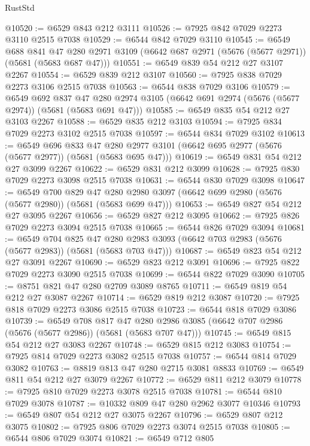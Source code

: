 \begin{lexlean}{RustStd}
\begin{coremodule}
@10520 := @6529 @843 @212 @3111
@10526 := @7925 @842 @7029 @2273 @3110 @2515 @7038
@10529 := @6544 @842 @7029 @3110
@10545 := @6549
    @688
    @841
    @47
    @280
    @2971
    @3109
    (@6642 @687 @2971 (@5676 (@5677 @2971)) (@5681 (@5683 @687 @47)))
@10551 := @6549 @839 @54 @212 @27 @3107 @2267
@10554 := @6529 @839 @212 @3107
@10560 := @7925 @838 @7029 @2273 @3106 @2515 @7038
@10563 := @6544 @838 @7029 @3106
@10579 := @6549
    @692
    @837
    @47
    @280
    @2974
    @3105
    (@6642 @691 @2974 (@5676 (@5677 @2974)) (@5681 (@5683 @691 @47)))
@10585 := @6549 @835 @54 @212 @27 @3103 @2267
@10588 := @6529 @835 @212 @3103
@10594 := @7925 @834 @7029 @2273 @3102 @2515 @7038
@10597 := @6544 @834 @7029 @3102
@10613 := @6549
    @696
    @833
    @47
    @280
    @2977
    @3101
    (@6642 @695 @2977 (@5676 (@5677 @2977)) (@5681 (@5683 @695 @47)))
@10619 := @6549 @831 @54 @212 @27 @3099 @2267
@10622 := @6529 @831 @212 @3099
@10628 := @7925 @830 @7029 @2273 @3098 @2515 @7038
@10631 := @6544 @830 @7029 @3098
@10647 := @6549
    @700
    @829
    @47
    @280
    @2980
    @3097
    (@6642 @699 @2980 (@5676 (@5677 @2980)) (@5681 (@5683 @699 @47)))
@10653 := @6549 @827 @54 @212 @27 @3095 @2267
@10656 := @6529 @827 @212 @3095
@10662 := @7925 @826 @7029 @2273 @3094 @2515 @7038
@10665 := @6544 @826 @7029 @3094
@10681 := @6549
    @704
    @825
    @47
    @280
    @2983
    @3093
    (@6642 @703 @2983 (@5676 (@5677 @2983)) (@5681 (@5683 @703 @47)))
@10687 := @6549 @823 @54 @212 @27 @3091 @2267
@10690 := @6529 @823 @212 @3091
@10696 := @7925 @822 @7029 @2273 @3090 @2515 @7038
@10699 := @6544 @822 @7029 @3090
@10705 := @8751 @821 @47 @280 @2709 @3089 @8765
@10711 := @6549 @819 @54 @212 @27 @3087 @2267
@10714 := @6529 @819 @212 @3087
@10720 := @7925 @818 @7029 @2273 @3086 @2515 @7038
@10723 := @6544 @818 @7029 @3086
@10739 := @6549
    @708
    @817
    @47
    @280
    @2986
    @3085
    (@6642 @707 @2986 (@5676 (@5677 @2986)) (@5681 (@5683 @707 @47)))
@10745 := @6549 @815 @54 @212 @27 @3083 @2267
@10748 := @6529 @815 @212 @3083
@10754 := @7925 @814 @7029 @2273 @3082 @2515 @7038
@10757 := @6544 @814 @7029 @3082
@10763 := @8819 @813 @47 @280 @2715 @3081 @8833
@10769 := @6549 @811 @54 @212 @27 @3079 @2267
@10772 := @6529 @811 @212 @3079
@10778 := @7925 @810 @7029 @2273 @3078 @2515 @7038
@10781 := @6544 @810 @7029 @3078
@10787 := @10332 @809 @47 @280 @2962 @3077 @10346
@10793 := @6549 @807 @54 @212 @27 @3075 @2267
@10796 := @6529 @807 @212 @3075
@10802 := @7925 @806 @7029 @2273 @3074 @2515 @7038
@10805 := @6544 @806 @7029 @3074
@10821 := @6549
    @712
    @805

\end{coremodule}
\end{lexlean}

